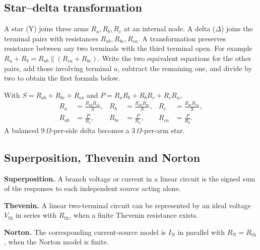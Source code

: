 \documentclass[12pt,a4paper]{article}
\begin{document}
\subsection{Star--delta transformation}
A star (Y) joins three arms \(R_a,R_b,R_c\) at an internal node. A delta (\(\Delta\)) joins the terminal pairs with resistances \(R_{ab},R_{bc},R_{ca}\). A transformation preserves resistance between any two terminals with the third terminal open. For example \(R_a+R_b=R_{ab}\parallel(R_{ca}+R_{bc})\). Write the two equivalent equations for the other pairs, add those involving terminal \(a\), subtract the remaining one, and divide by two to obtain the first formula below.

\begin{tcolorbox}[formulabox,title={Star--delta formulas}]
With \(S=R_{ab}+R_{bc}+R_{ca}\) and \(P=R_aR_b+R_bR_c+R_cR_a\),
\[
\begin{aligned}
R_a&=\frac{R_{ab}R_{ca}}{S},&
R_b&=\frac{R_{ab}R_{bc}}{S},&
R_c&=\frac{R_{bc}R_{ca}}{S},\\[3pt]
R_{ab}&=\frac{P}{R_c},&
R_{bc}&=\frac{P}{R_a},&
R_{ca}&=\frac{P}{R_b}.
\end{aligned}
\]
A balanced \(9\,\Omega\)-per-side delta becomes a \(3\,\Omega\)-per-arm star.
\end{tcolorbox}

\subsection{Superposition, Thevenin and Norton}
\begin{tcolorbox}[defbox,title={Three linear-network theorems}]
\textbf{Superposition.} A branch voltage or current in a linear circuit is the signed sum of the responses to each independent source acting alone.

\textbf{Thevenin.} A linear two-terminal circuit can be represented by an ideal voltage \(V_{\mathrm{th}}\) in series with \(R_{\mathrm{th}}\), when a finite Thevenin resistance exists.

\textbf{Norton.} The corresponding current-source model is \(I_{\mathrm N}\) in parallel with \(R_{\mathrm N}=R_{\mathrm{th}}\), when the Norton model is finite.
\end{tcolorbox}
\end{document}
